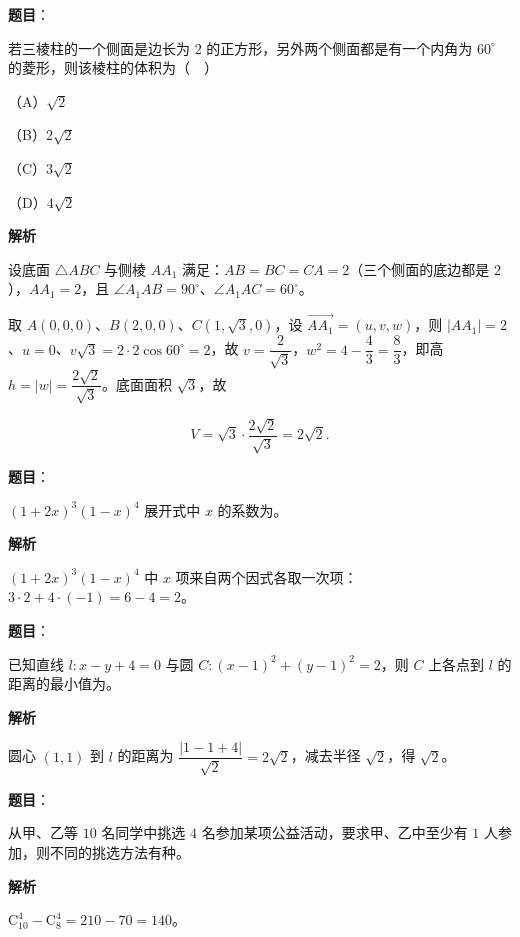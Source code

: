 \begin{answer}

\textbf{题目}：

若三棱柱的一个侧面是边长为 $2$ 的正方形，另外两个侧面都是有一个内角为 $60^\circ$ 的菱形，则该棱柱的体积为（　）

（A）$\sqrt2$

（B）$2\sqrt2$

（C）$3\sqrt2$

（D）$4\sqrt2$

\textbf{解析}

设底面 $\triangle ABC$ 与侧棱 $AA_1$ 满足：$AB=BC=CA=2$（三个侧面的底边都是 $2$），$AA_1=2$，且 $\angle A_1AB=90^\circ$、$\angle A_1AC=60^\circ$。

取 $A(0,0,0)$、$B(2,0,0)$、$C(1,\sqrt3,0)$，设 $\overrightarrow{AA_1}=(u,v,w)$，则 $|AA_1|=2$、$u=0$、$v\sqrt3=2\cdot2\cos60^\circ=2$，故 $v=\dfrac2{\sqrt3}$，$w^2=4-\dfrac43=\dfrac83$，即高 $h=|w|=\dfrac{2\sqrt2}{\sqrt3}$。底面面积 $\sqrt3$，故

\nopagebreak[4]
\[V=\sqrt3\cdot\frac{2\sqrt2}{\sqrt3}=2\sqrt2.\]


\end{answer}
\begin{answer}

\textbf{题目}：

$(1+2x)^3(1-x)^4$ 展开式中 $x$ 的系数为\gkblank{}。

\textbf{解析}

$(1+2x)^3(1-x)^4$ 中 $x$ 项来自两个因式各取一次项：$3\cdot2+4\cdot(-1)=6-4=2$。


\end{answer}
\begin{answer}

\textbf{题目}：

已知直线 $l:x-y+4=0$ 与圆 $C:(x-1)^2+(y-1)^2=2$，则 $C$ 上各点到 $l$ 的距离的最小值为\gkblank{}。

\textbf{解析}

圆心 $(1,1)$ 到 $l$ 的距离为 $\dfrac{|1-1+4|}{\sqrt2}=2\sqrt2$，减去半径 $\sqrt2$，得 $\sqrt2$。


\end{answer}
\begin{answer}

\textbf{题目}：

从甲、乙等 $10$ 名同学中挑选 $4$ 名参加某项公益活动，要求甲、乙中至少有 $1$ 人参加，则不同的挑选方法有\gkblank{}种。

\textbf{解析}

$\mathrm C_{10}^4-\mathrm C_8^4=210-70=140$。


\end{answer}
